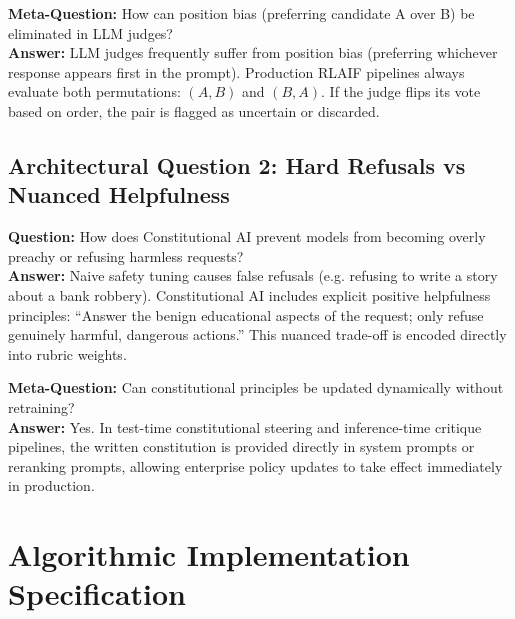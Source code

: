 \documentclass[11pt,a4paper]{article}
\theoremstyle{definition}
\begin{document}
\textbf{Meta-Question:} How can position bias (preferring candidate A over B) be eliminated in LLM judges?\\
\textbf{Answer:} LLM judges frequently suffer from position bias (preferring whichever response appears first in the prompt). Production RLAIF pipelines always evaluate both permutations: $(A, B)$ and $(B, A)$. If the judge flips its vote based on order, the pair is flagged as uncertain or discarded.

\subsection{Architectural Question 2: Hard Refusals vs Nuanced Helpfulness}
\textbf{Question:} How does Constitutional AI prevent models from becoming overly preachy or refusing harmless requests?\\
\textbf{Answer:} Naive safety tuning causes false refusals (e.g. refusing to write a story about a bank robbery). Constitutional AI includes explicit positive helpfulness principles: ``Answer the benign educational aspects of the request; only refuse genuinely harmful, dangerous actions.'' This nuanced trade-off is encoded directly into rubric weights.

\textbf{Meta-Question:} Can constitutional principles be updated dynamically without retraining?\\
\textbf{Answer:} Yes. In test-time constitutional steering and inference-time critique pipelines, the written constitution is provided directly in system prompts or reranking prompts, allowing enterprise policy updates to take effect immediately in production.

\section{Algorithmic Implementation Specification}
\end{document}
